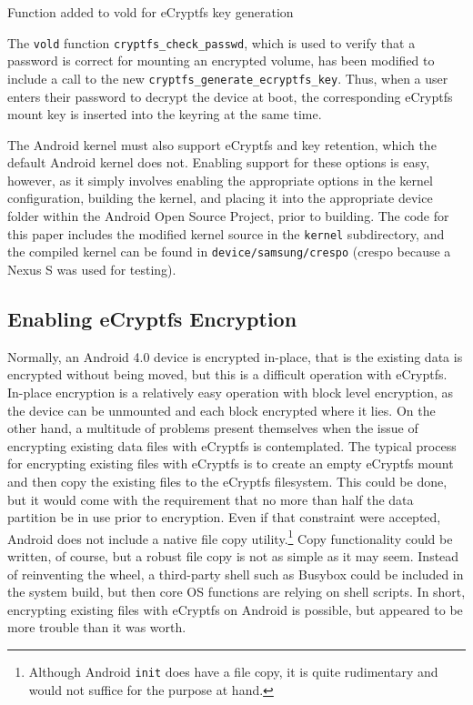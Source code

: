 \begin{table}[htb]
 
\caption{Function added to vold for eCryptfs key generation}
\label{tab:generate-key}
\end{table}

The \texttt{vold} function \texttt{cryptfs\_check\_passwd}, which is used to verify that a password is correct for mounting an
encrypted volume, has been modified to include a call to the new \texttt{cryptfs\_generate\_ecryptfs\_key}. Thus, when a user enters
their password to decrypt the device at boot, the corresponding eCryptfs mount key is inserted into the keyring at the same time.

The Android kernel must also support eCryptfs and key retention, which the default Android kernel does not. Enabling support for
these options is easy, however, as it simply involves enabling the appropriate options in the kernel configuration, building the
kernel, and placing it into the appropriate device folder within the Android Open Source Project, prior to building. The code for
this paper includes the modified kernel source in the \texttt{kernel} subdirectory, and the compiled kernel can be found in
\texttt{device/samsung/crespo} (crespo because a Nexus S was used for testing).

\subsection{Enabling eCryptfs Encryption} Normally, an Android 4.0 device is encrypted in-place, that is the existing data is
encrypted without being moved, but this is a difficult operation with eCryptfs. In-place encryption is a relatively easy operation
with block level encryption, as the device can be unmounted and each block encrypted where it lies. On the other hand, a multitude
of problems present themselves when the issue of encrypting existing data files with eCryptfs is contemplated.  The typical process
for encrypting existing files with eCryptfs is to create an empty eCryptfs mount and then copy the existing files to the eCryptfs
filesystem.  This could be done, but it would come with the requirement that no more than half the data partition be in use prior to
encryption. Even if that constraint were accepted, Android does not include a native file copy utility.\footnote{Although Android
\texttt{init} does have a file copy, it is quite rudimentary and would not suffice for the purpose at hand.} Copy functionality
could be written, of course, but a robust file copy is not as simple as it may seem. Instead of reinventing the wheel, a third-party
shell such as Busybox could be included in the system build, but then core OS functions are relying on shell scripts. In short,
encrypting existing files with eCryptfs on Android is possible, but appeared to be more trouble than it was worth.

